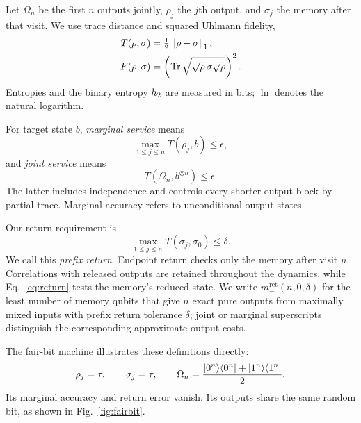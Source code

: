\documentclass[aps,pra,reprint,superscriptaddress,longbibliography,nofootinbib,floatfix]{revtex4-2}
\begin{document}
Let $\Omega_n$ be the first $n$ outputs jointly, $\rho_j$ the $j$th output, and $\sigma_j$ the memory after that visit. We use trace distance and squared Uhlmann fidelity,
\begin{align}
 T(\rho,\sigma)&=\tfrac12\left\lVert\rho-\sigma\right\rVert_1,\nonumber\\
 F(\rho,\sigma)&=\left(\operatorname{Tr}\sqrt{\sqrt\rho\,\sigma\sqrt\rho}\right)^2.
 \label{eq:conventions}
\end{align}
Entropies and the binary entropy $h_2$ are measured in bits; $\ln$ denotes the natural logarithm.

For target state $b$, \emph{marginal service} means
\begin{equation}
 \max_{1\le j\le n}T(\rho_j,b)\le\epsilon,
 \label{eq:marginal}
\end{equation}
and \emph{joint service} means
\begin{equation}
 T(\Omega_n,b^{\otimes n})\le\epsilon.
 \label{eq:joint}
\end{equation}
The latter includes independence and controls every shorter output block by partial trace. Marginal accuracy refers to unconditional output states.

Our return requirement is
\begin{equation}
 \max_{1\le j\le n}T(\sigma_j,\sigma_0)\le\delta.
 \label{eq:return}
\end{equation}
We call this \emph{prefix return}. Endpoint return checks only the memory after visit $n$. Correlations with released outputs are retained throughout the dynamics, while Eq.~\eqref{eq:return} tests the memory's reduced state. We write $m_-^{\mathrm{ret}}(n,0,\delta)$ for the least number of memory qubits that give $n$ exact pure outputs from maximally mixed inputs with prefix return tolerance $\delta$; joint or marginal superscripts distinguish the corresponding approximate-output costs.

The fair-bit machine illustrates these definitions directly:
\begin{equation}
 \rho_j=\tau,\qquad \sigma_j=\tau,\qquad
 \Omega_n=\frac{|0^n\rangle\langle0^n|+|1^n\rangle\langle1^n|}2.
 \label{eq:fairbit}
\end{equation}
Its marginal accuracy and return error vanish. Its outputs share the same random bit, as shown in Fig.~\ref{fig:fairbit}.
\end{document}
